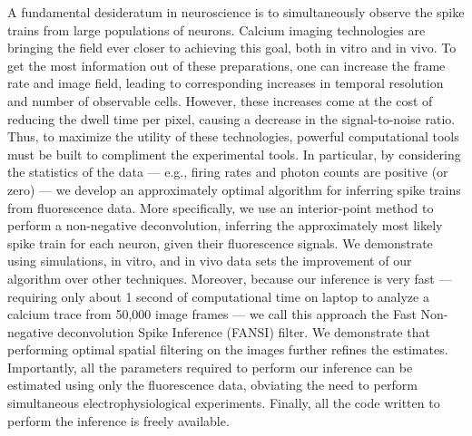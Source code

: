 
A fundamental desideratum in neuroscience is to simultaneously observe the spike trains from large populations of neurons. Calcium imaging technologies are bringing the field ever closer to achieving this goal, both in vitro and in vivo. To get the most information out of these preparations, one can increase the frame rate and image field, leading to corresponding increases in temporal resolution and number of observable cells.  However, these increases come at the cost of reducing the dwell time per pixel, causing a decrease in the signal-to-noise ratio.  Thus, to maximize the utility of these technologies, powerful computational tools must be built to compliment the experimental tools.  In particular, by considering the statistics of the data --- e.g., firing rates and photon counts are positive (or zero) --- we develop an approximately optimal algorithm for inferring spike trains from fluorescence data. More specifically, we use an interior-point method to perform a non-negative deconvolution, inferring the approximately most likely spike train for each neuron, given their fluorescence signals. We demonstrate using simulations, in vitro, and in vivo data sets the improvement of our algorithm over other techniques.  Moreover, because our inference is very fast --- requiring only about 1 second of computational time on laptop to analyze a calcium trace from 50,000 image frames --- we call this approach the Fast Non-negative deconvolution Spike Inference (FANSI) filter. We demonstrate that performing optimal spatial filtering on the images further refines the estimates.  Importantly, all the parameters required to perform our inference can be estimated using only the fluorescence data, obviating the need to perform simultaneous electrophysiological experiments.  Finally, all the code written to perform the inference is freely available.


